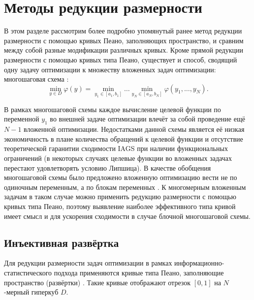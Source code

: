 \section{Методы редукции размерности}
В этом разделе рассмотрим более подробно упомянутый ранее метод редукции размерности
с помощью кривых Пеано, заполняющих пространство, и сравним между собой разные модификации различных кривых.
Кроме прямой редукции размерности с помощью кривых типа Пеано, существует и способ, сводящий одну задачу оптимизации к
множеству вложенных задач оптимизации: многошаговая схема \cite{strongin1978}: 
\begin{equation}
  \label{eq:3}
  \min_{y \in D} \varphi(y) = \min_{y_1 \in [a_1, b_1]} \dots \min_{y_N \in [a_N, b_N]} \varphi(y_1, \dots, y_N).
\end{equation}

В рамках многошаговой схемы каждое вычисление целевой функции по переменной \(y_1\) во внешней задаче оптимизации влечёт за собой
проведение ещё \(N-1\) вложенной оптимизации. Недостатками данной схемы является её низкая экономичность в плане количества
обращений к целевой функции и отсутствие теоретической гаранитии сходимости IAGS при наличии функциональных ограничений
(в некоторых случаях целевые функции во вложенных задачах перестают удовлетворять условию Липшица). В качестве обобщения
многошаговой схемы было предложено вложенную оптимизацию вести не по одиночным переменным, а по блокам переменных \cite{globalizerSystem}.
К многомерным вложенным задачам в таком случае можно применить редукцию размерности с помощью кривых типа Пеано,
поэтому выявление наиболее эффективного типа кривой имеет смысл и для ускорения сходимости в случае блочной многошаговой схемы.

\subsection{Инъективная развёртка}

Для редукции размерности задач оптимизации в рамках информационно-статистического подхода
применяются кривые типа Пеано, заполняющие пространство (развёртки) \cite{Sergeyev2013, strongin1978,
Gergel2009, Strongin2000}. Такие кривые отображают
отрезок \([0,1]\) на \(N\)-мерный гиперкуб \(D\).


